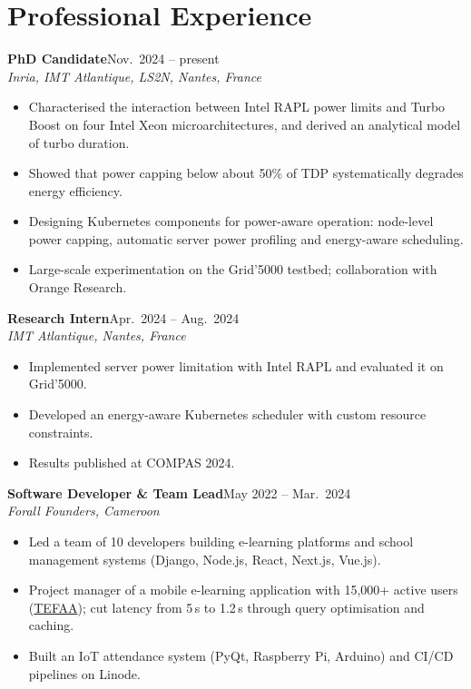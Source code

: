 \documentclass[10pt,a4paper]{article}
\newcommand{\entry}[3]{%
  \textbf{#1}\hfill{\color{muted}#2}\\
  {\color{muted}\itshape #3}\par\vspace{0.2ex}}
\newcommand{\link}[2]{\href{#1}{{\color{accent}#2}}}
\begin{document}
\section{Professional Experience}
\entry{PhD Candidate}{Nov.\ 2024 -- present}{Inria, IMT Atlantique, LS2N, Nantes, France}
\begin{itemize}
  \item Characterised the interaction between Intel RAPL power limits and Turbo Boost on four
        Intel Xeon microarchitectures, and derived an analytical model of turbo duration.
  \item Showed that power capping below about 50\% of TDP systematically degrades energy efficiency.
  \item Designing Kubernetes components for power-aware operation: node-level power capping,
        automatic server power profiling and energy-aware scheduling.
  \item Large-scale experimentation on the Grid'5000 testbed; collaboration with Orange Research.
\end{itemize}

\entry{Research Intern}{Apr.\ 2024 -- Aug.\ 2024}{IMT Atlantique, Nantes, France}
\begin{itemize}
  \item Implemented server power limitation with Intel RAPL and evaluated it on Grid'5000.
  \item Developed an energy-aware Kubernetes scheduler with custom resource constraints.
  \item Results published at COMPAS 2024.
\end{itemize}

\entry{Software Developer \& Team Lead}{May 2022 -- Mar.\ 2024}{Forall Founders, Cameroon}
\begin{itemize}
  \item Led a team of 10 developers building e-learning platforms and school management systems
        (Django, Node.js, React, Next.js, Vue.js).
  \item Project manager of a mobile e-learning application with 15,000+ active users
        (\link{https://tefaafrik.com}{TEFAA}); cut latency from 5\,s to 1.2\,s through query
        optimisation and caching.
  \item Built an IoT attendance system (PyQt, Raspberry Pi, Arduino) and CI/CD pipelines on Linode.
\end{itemize}
\end{document}
